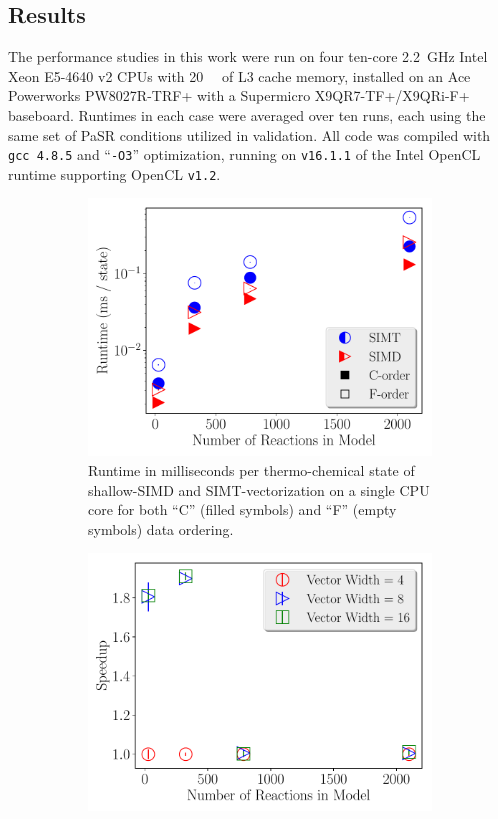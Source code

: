 \documentclass[12pt]{ussci}
\begin{document}
\subsection{Results}
\label{S:results}
The performance studies in this work were run on four ten-core \SI{2.2}{\giga\hertz} Intel Xeon E5-4640 v2 CPUs with \SI{20}{\mega\byte} of L3 cache memory, installed on an Ace Powerworks PW8027R-TRF+ with a Supermicro X9QR7-TF+/X9QRi-F+ baseboard.
Runtimes in each case were averaged over ten runs, each using the same set of PaSR conditions utilized in validation.
All code was compiled with \texttt{gcc 4.8.5} and ``\texttt{-O3}'' optimization, running on \texttt{v16.1.1} of the Intel OpenCL runtime supporting OpenCL \texttt{v1.2}.

\begin{figure}[htb]
  \centering
  \begin{subfigure}[t]{0.48\textwidth}
    \includegraphics[width=\textwidth]{SIMD_SIMT_Order_comparison}
    \caption{Runtime in milliseconds per thermo-chemical state of shallow-SIMD and SIMT-vectorization on a single CPU core for both ``C'' (filled symbols) and ``F'' (empty symbols) data ordering.}
    \label{F:SIMDComp}
  \end{subfigure}
  \hfill
  \begin{subfigure}[t]{0.48\textwidth}
    \includegraphics[width=\textwidth]{SIMD_Vecwidth_comparison}

\end{subfigure}
\end{figure}
\end{document}
